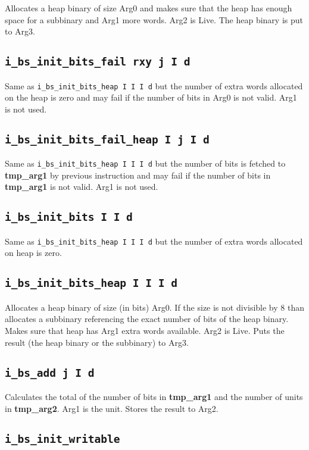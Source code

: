 \documentclass{article}
\newcommand{\tmpa}{\textbf{tmp\_arg1}}
\newcommand{\tmpb}{\textbf{tmp\_arg2}}
\newcommand{\iop}[1]{\texttt{#1}}
\begin{document}
Allocates a heap binary of size Arg0 and makes sure that the heap has enough
space for a subbinary and Arg1 more words. Arg2 is Live. The heap binary is put
to Arg3.

\subsection*{\iop{i\_bs\_init\_bits\_fail rxy j I d}}

Same as \iop{i\_bs\_init\_bits\_heap I I I d} but the number of extra words
allocated on the heap is zero and may fail if the number of bits in Arg0 is not
valid. Arg1 is not used.

\subsection*{\iop{i\_bs\_init\_bits\_fail\_heap I j I d}}

Same as \iop{i\_bs\_init\_bits\_heap I I I d} but the number of bits is fetched
to \tmpa{} by previous instruction and may fail if the number of bits in \tmpa{}
is not valid. Arg1 is not used.

\subsection*{\iop{i\_bs\_init\_bits I I d}}

Same as \iop{i\_bs\_init\_bits\_heap I I I d} but the number of extra words
allocated on heap is zero.

\subsection*{\iop{i\_bs\_init\_bits\_heap I I I d}}

Allocates a heap binary of size (in bits) Arg0. If the size is not divisible by
8 than allocates a subbinary referencing the exact number of bits of the heap
binary. Makes sure that heap has Arg1 extra words available. Arg2 is Live. Puts
the result (the heap binary or the subbinary) to Arg3.

\subsection*{\iop{i\_bs\_add j I d}}

Calculates the total of the number of bits in \tmpa{} and the number of units in
\tmpb{}. Arg1 is the unit. Stores the result to Arg2.

\subsection*{\iop{i\_bs\_init\_writable}}
\end{document}
